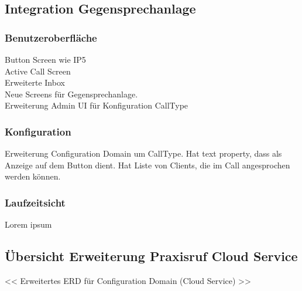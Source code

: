 \clearpage

\subsection{Integration Gegensprechanlage}

\subsubsection*{Benutzeroberfläche}

Button Screen wie IP5 \\
Active Call Screen \\
Erweiterte Inbox \\
Neue Screens für Gegensprechanlage. \\
Erweiterung Admin UI für Konfiguration CallType \\


\subsubsection*{Konfiguration}
Erweiterung Configuration Domain um CallType.
Hat text property, dass als Anzeige auf dem Button dient.
Hat Liste von Clients, die im Call angesprochen werden können.

\subsubsection*{Laufzeitsicht}
Lorem ipsum

\clearpage

\subsection{Übersicht Erweiterung Praxisruf Cloud Service}

<< Erweitertes ERD für Configuration Domain (Cloud Service) >>

\clearpage
